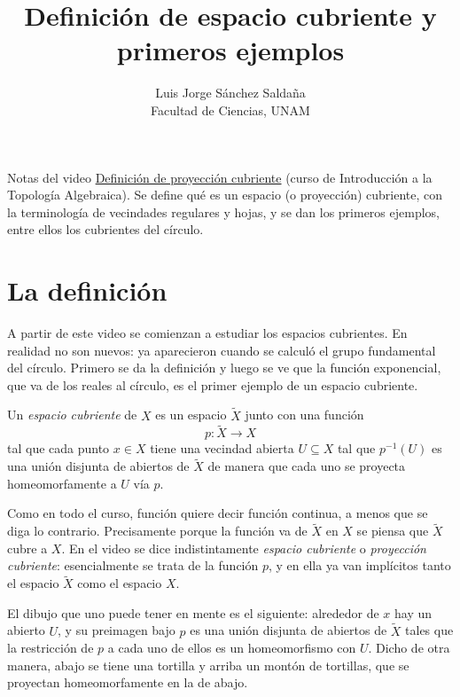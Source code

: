 \documentclass[11pt]{article}
\title{Definición de espacio cubriente y primeros ejemplos}
\author{Luis Jorge Sánchez Saldaña\\[2pt]\small Facultad de Ciencias, UNAM}
\date{}
\begin{document}
\maketitle

\noindent\small Notas del video
\href{https://www.youtube.com/watch?v=CQEi2Hn-UGY}{\guillemotleft{}Definición de proyección cubriente\guillemotright{}}
(curso de Introducción a la Topología Algebraica). Se define qué es un espacio (o proyección) cubriente, con la terminología de vecindades regulares y hojas, y se dan los primeros ejemplos, entre ellos los cubrientes del círculo.
\normalsize

\section*{La definición}

A partir de este video se comienzan a estudiar los espacios cubrientes. En realidad no son nuevos: ya aparecieron cuando se calculó el grupo fundamental del círculo. Primero se da la definición y luego se ve que la función exponencial, que va de los reales al círculo, es el primer ejemplo de un espacio cubriente.

\begin{defn}\label{defn:cubriente}
Un \emph{espacio cubriente} de $X$ es un espacio $\tilde X$ junto con una función
\[
  p\colon\tilde X\to X
\]
tal que cada punto $x\in X$ tiene una vecindad abierta $U\subseteq X$ tal que $p^{-1}(U)$ es una unión disjunta de abiertos de $\tilde X$ de manera que cada uno se proyecta homeomorfamente a $U$ vía $p$.
\end{defn}

Como en todo el curso, \guillemotleft{}función\guillemotright{} quiere decir función continua, a menos que se diga lo contrario. Precisamente porque la función va de $\tilde X$ en $X$ se piensa que $\tilde X$ \guillemotleft{}cubre\guillemotright{} a $X$. En el video se dice indistintamente \emph{espacio cubriente} o \emph{proyección cubriente}: esencialmente se trata de la función $p$, y en ella ya van implícitos tanto el espacio $\tilde X$ como el espacio $X$.

El dibujo que uno puede tener en mente es el siguiente: alrededor de $x$ hay un abierto $U$, y su preimagen bajo $p$ es una unión disjunta de abiertos de $\tilde X$ tales que la restricción de $p$ a cada uno de ellos es un homeomorfismo con $U$. Dicho de otra manera, abajo se tiene una tortilla y arriba un montón de tortillas, que se proyectan homeomorfamente en la de abajo.
\end{document}
